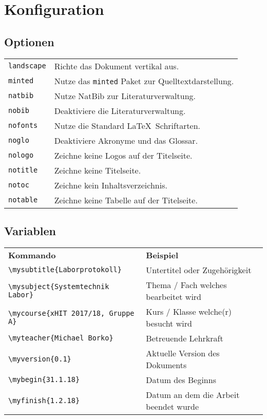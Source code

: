 
\section{Konfiguration}
\subsection{Optionen}
\begin{tabularx}{\textwidth}{l X}
\texttt{landscape} & Richte das Dokument vertikal aus.\\
\texttt{minted} & Nutze das \texttt{minted} Paket zur Quelltextdarstellung.\\
\texttt{natbib} & Nutze NatBib zur Literaturverwaltung.\\
\texttt{nobib} & Deaktiviere die Literaturverwaltung.\\
\texttt{nofonts} & Nutze die Standard \LaTeX ~Schriftarten.\\
\texttt{noglo} & Deaktiviere Akronyme und das Glossar.\\
\texttt{nologo} & Zeichne keine Logos auf der Titelseite.\\
\texttt{notitle} & Zeichne keine Titelseite.\\
\texttt{notoc} & Zeichne kein Inhaltsverzeichnis.\\
\texttt{notable} & Zeichne keine Tabelle auf der Titelseite.
\end{tabularx}

\subsection{Variablen}
\begin{tabularx}{\textwidth}{l X}
\textbf{Kommando} & \textbf{Beispiel}\\

\verb|\mysubtitle{Laborprotokoll}| & Untertitel oder Zugehörigkeit\\
\verb|\mysubject{Systemtechnik Labor}| & Thema / Fach welches bearbeitet wird\\
\verb|\mycourse{xHIT 2017/18, Gruppe A}| & Kurs / Klasse welche(r) besucht wird\\
\verb|\myteacher{Michael Borko}| & Betreuende Lehrkraft\\
\verb|\myversion{0.1}| & Aktuelle Version des Dokuments\\
\verb|\mybegin{31.1.18}| & Datum des Beginns\\
\verb|\myfinish{1.2.18}| & Datum an dem die Arbeit beendet wurde
\end{tabularx}

